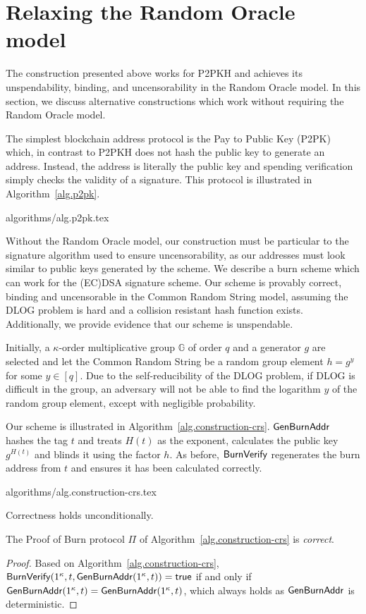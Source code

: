 \section{Relaxing the Random Oracle model}\label{sec:standard}

The construction presented above works for P2PKH and achieves its unspendability, binding, and uncensorability in the Random Oracle model. In this section, we discuss alternative constructions which work without requiring the Random Oracle model.

The simplest blockchain address protocol is the Pay to Public Key (P2PK) which, in contrast to P2PKH does not hash the public key to generate an address. Instead, the address is literally the public key and spending verification simply checks the validity of a signature. This protocol is illustrated in Algorithm~\ref{alg.p2pk}.

{algorithms/alg.p2pk.tex}

Without the Random Oracle model, our construction must be particular to the signature algorithm used to ensure uncensorability, as our addresses must look similar to public keys generated by the scheme. We describe a burn scheme which can work for the (EC)DSA signature scheme. Our scheme is provably correct, binding and uncensorable in the Common Random String model, assuming the DLOG problem is hard and a collision resistant hash function exists. Additionally, we provide evidence that our scheme is unspendable.

Initially, a $\kappa$-order multiplicative group $\mathbb{G}$ of order $q $ and a generator $g$ are selected and let the Common Random String be a random group element $h = g^y$ for some $y \in [q]$. Due to the self-reducibility of the DLOG problem, if DLOG is difficult in the group, an adversary will not be able to find the logarithm $y$ of the random group element, except with negligible probability.

Our scheme is illustrated in Algorithm~\ref{alg.construction-crs}. $\mathsf{Gen}\-\mathsf{Burn}\-\mathsf{Addr}$ hashes the tag $t$ and treats $H(t)$ as the exponent, calculates the public key $g^{H(t)}$ and blinds it using the factor $h$. As before, $\mathsf{BurnVerify}$ regenerates the burn address from $t$ and ensures it has been calculated correctly.

{algorithms/alg.construction-crs.tex}

Correctness holds unconditionally.

\begin{theorem}[Correctness]
  The Proof of Burn protocol $\Pi$ of Algorithm~\ref{alg.construction-crs} is \emph{correct}.
\end{theorem}
\begin{proof}
  Based on Algorithm~\ref{alg.construction-crs}, $\mathsf{BurnVerify}(1^\kappa, t, \mathsf{Gen}\-\mathsf{Burn}\-\mathsf{Addr}(1^\kappa, t)) = \textsf{true}$ if and only if $\mathsf{Gen}\-\mathsf{Burn}\-\mathsf{Addr}(1^\kappa, t) = \mathsf{Gen}\-\mathsf{Burn}\-\mathsf{Addr}(1^\kappa, t)$, which always holds as $\mathsf{Gen}\-\mathsf{Burn}\-\mathsf{Addr}$ is deterministic.
\end{proof}

